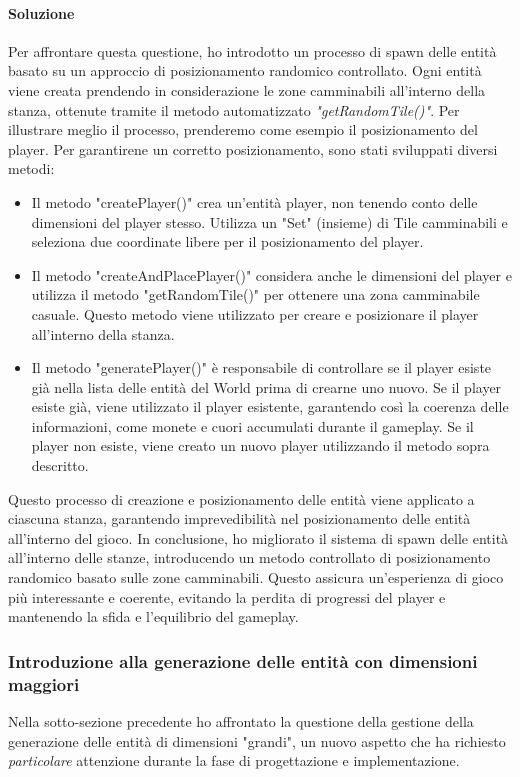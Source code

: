 \documentclass[a4paper,12pt]{report}
\begin{document}
\paragraph*{Soluzione}
Per affrontare questa questione, ho introdotto un processo di spawn delle entità basato su un approccio di posizionamento randomico controllato. 
Ogni entità viene creata prendendo in considerazione le zone camminabili all'interno della stanza, ottenute tramite il metodo automatizzato \textit{"getRandomTile()"}.
Per illustrare meglio il processo, prenderemo come esempio il posizionamento del player. 
Per garantirene un corretto posizionamento, sono stati sviluppati diversi metodi:
\begin{itemize}
	\item Il metodo "createPlayer()" crea un'entità player, non tenendo conto delle dimensioni del player stesso.
	Utilizza un "Set" (insieme) di Tile camminabili e seleziona due coordinate libere per il posizionamento del player.  
	\item Il metodo "createAndPlacePlayer()" considera anche le dimensioni del player e utilizza il metodo "getRandomTile()" per ottenere una zona camminabile casuale. 
	Questo metodo viene utilizzato per creare e posizionare il player all'interno della stanza.
	\item Il metodo "generatePlayer()" è responsabile di controllare se il player esiste già nella lista delle entità del World prima di crearne uno nuovo. 
	Se il player esiste già, viene utilizzato il player esistente, garantendo così la coerenza delle informazioni, come monete e cuori accumulati durante il gameplay. 
	Se il player non esiste, viene creato un nuovo player utilizzando il metodo sopra descritto.
\end{itemize}
Questo processo di creazione e posizionamento delle entità viene applicato a ciascuna stanza, garantendo imprevedibilità nel posizionamento delle entità all'interno del gioco.
In conclusione, ho migliorato il sistema di spawn delle entità all'interno delle stanze, introducendo un metodo controllato di posizionamento randomico basato sulle zone camminabili. 
Questo assicura un'esperienza di gioco più interessante e coerente, evitando la perdita di progressi del player e mantenendo la sfida e l'equilibrio del gameplay.
\subsubsection*{Introduzione alla generazione delle entità con dimensioni maggiori}
Nella sotto-sezione precedente ho affrontato la questione della gestione della generazione delle entità di dimensioni "grandi", un nuovo aspetto che ha richiesto \textit{particolare} attenzione durante la fase di progettazione e implementazione.
\end{document}
